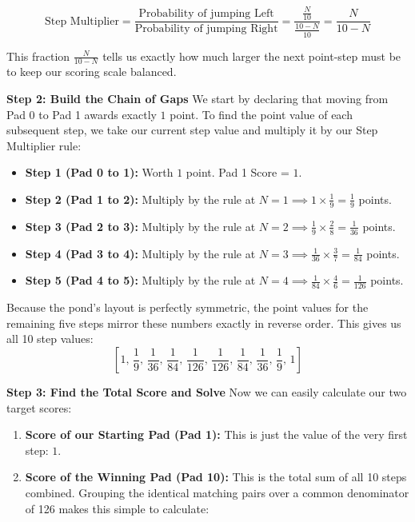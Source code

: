 \begin{enumerate}
 
 \[\text{Step Multiplier} = \frac{\text{Probability of jumping Left}}{\text{Probability of jumping Right}} = \frac{\frac{N}{10}}{\frac{10-N}{10}} = \frac{N}{10-N}\]

 This fraction $\frac{N}{10-N}$ tells us exactly how much larger the next point-step must be to keep our scoring scale balanced.

 \textbf{Step 2: Build the Chain of Gaps} We start by declaring that moving from Pad 0 to Pad 1 awards exactly $1$ point. To find the point value of each subsequent step, we take our current step value and multiply it by our Step Multiplier rule:

 
            \begin{itemize}
        \item \textbf{Step 1 (Pad 0 to 1):} Worth $1$ point. Pad 1 Score = $1$.
        \item \textbf{Step 2 (Pad 1 to 2):} Multiply by the rule at $N=1 \implies 1 \times \frac{1}{9} = \frac{1}{9}$ points.
        \item \textbf{Step 3 (Pad 2 to 3):} Multiply by the rule at $N=2 \implies \frac{1}{9} \times \frac{2}{8} = \frac{1}{36}$ points.
        \item \textbf{Step 4 (Pad 3 to 4):} Multiply by the rule at $N=3 \implies \frac{1}{36} \times \frac{3}{7} = \frac{1}{84}$ points.
        \item \textbf{Step 5 (Pad 4 to 5):} Multiply by the rule at $N=4 \implies \frac{1}{84} \times \frac{4}{6} = \frac{1}{126}$ points.
            \end{itemize}
            Because the pond's layout is perfectly symmetric, the point values for the remaining five steps mirror these numbers exactly in reverse order. This gives us all 10 step values:
 \[\left[ 1, \, \frac{1}{9}, \, \frac{1}{36}, \, \frac{1}{84}, \, \frac{1}{126}, \, \frac{1}{126}, \, \frac{1}{84}, \, \frac{1}{36}, \, \frac{1}{9}, \, 1 \right]\]

 \textbf{Step 3: Find the Total Score and Solve} Now we can easily calculate our two target scores:

 
            \begin{enumerate}
        \item \textbf{Score of our Starting Pad (Pad 1):} This is just the value of the very first step: $1$.
        \item \textbf{Score of the Winning Pad (Pad 10):} This is the total sum of all 10 steps combined. Grouping the identical matching pairs over a common denominator of 126 makes this simple to calculate:
            \end{enumerate}
            

\end{enumerate}

